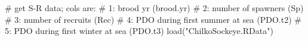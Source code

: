 \begin{Schunk}
\begin{Sinput}
 # get S-R data; cols are:
 # 1: brood yr (brood.yr)
 # 2: number of spawners (Sp)
 # 3: number of recruits (Rec)
 # 4: PDO during first summer at sea (PDO.t2)
 # 5: PDO during first winter at sea (PDO.t3)
 load("ChilkoSockeye.RData")
\end{Sinput}
\end{Schunk}
